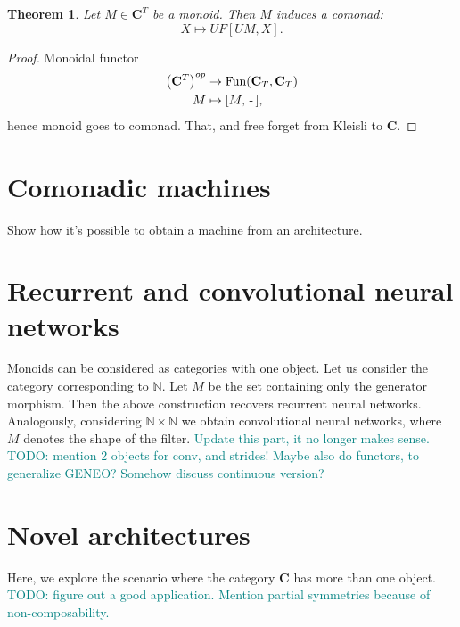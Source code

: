 \documentclass[12pt]{article}
\newtheorem{theorem}{Theorem}
\newcommand{\pietro}[1]{\textcolor{teal}{#1}}
\newcommand{\N}{{\mathbb{N}}}
\newcommand{\Fun}{{\textnormal{Fun}}}
\newcommand{\Cat}{{\mathbf{C}}}
\newcommand{\anon}{{\,\mbox{-}\,}}
\begin{document}
\begin{theorem}\label{thm:weight_sharing}
    Let $M \in \Cat^T$ be a monoid. Then $M$ induces a comonad:
    \begin{equation*}
        X \mapsto UF[UM, X].
    \end{equation*}
\end{theorem}

\begin{proof}
    Monoidal functor
    \begin{align*}
        \left(\Cat^T\right)^{op} &\rightarrow \Fun(\Cat_T, \Cat_T)\\
        M &\mapsto [M, \anon],
    \end{align*}
    hence monoid goes to comonad. That, and free forget from Kleisli to $\Cat$.
\end{proof}

\section{Comonadic machines}

Show how it's possible to obtain a machine from an architecture.

\section{Recurrent and convolutional neural networks}

Monoids can be considered as categories with one object. Let us consider the category corresponding to $\N$. Let $M$ be the set containing only the generator morphism. Then the above construction recovers recurrent neural networks. Analogously, considering $\N \times \N$ we obtain convolutional neural networks, where $M$ denotes the shape of the filter. \pietro{Update this part, it no longer makes sense.}
\pietro{TODO: mention 2 objects for conv, and strides!}
\pietro{Maybe also do functors, to generalize GENEO? Somehow discuss continuous version?}

\section{Novel architectures}

Here, we explore the scenario where the category $\Cat$ has more than one object.
\pietro{TODO: figure out a good application.}
\pietro{Mention partial symmetries because of non-composability.}



\end{document}
